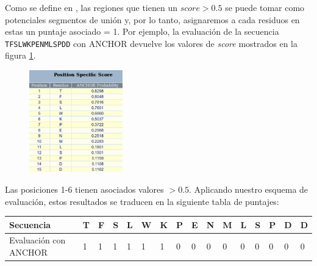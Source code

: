 Como se define en \cite{dosztanyi2009anchor}, las regiones que tienen un $score>0.5$ se puede tomar como potenciales segmentos de unión y, por lo tanto, asignaremos a cada residuos en estas un puntaje asociado = 1.
Por ejemplo, la evaluación de la secuencia \texttt{TFSLWKPENMLSPDD} con ANCHOR devuelve los valores de \textit{score} mostrados en la figura \ref{anchorResults}. 

\begin{figure}[ht]
\centering
\includegraphics[width=0.36\textwidth]{img/anchorTabla.png} 
\caption{}
\label{anchorResults}
\end{figure}

Las posiciones 1-6 tienen asociados valores $>0.5$. Aplicando nuestro esquema de evaluación, estos resultados se traducen en la siguiente tabla de puntajes:

\vspace{0.2cm}
\begin{center}
\begin{tabular}{llllllllllllllll} 
\hline      
Secuencia & \textbf{T} & \textbf{F} & \textbf{S} & \textbf{L} & \textbf{W} & \textbf{K} & \textbf{P} & \textbf{E} & \textbf{N} & \textbf{M} & \textbf{L} & \textbf{S} & \textbf{P} & \textbf{D} & \textbf{D} \\ \hline
Evaluación con ANCHOR & 1 & 1 & 1 & 1 & 1 & 1 & 0 & 0 & 0 & 0 & 0 & 0 & 0 & 0 & 0\\ \hline
\end{tabular}
\end{center}
























